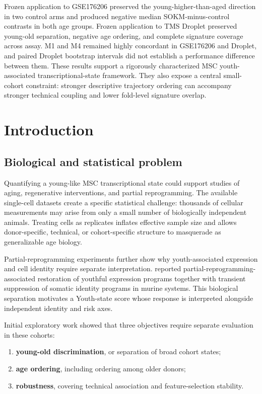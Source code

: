 \documentclass[10pt,twocolumn]{article}
\providecommand{\tightlist}{\setlength{\itemsep}{0pt}\setlength{\parskip}{0pt}}
\begin{document}
Frozen application to GSE176206 preserved the young-higher-than-aged direction in two control arms and produced negative median SOKM-minus-control contrasts in both age groups. Frozen application to TMS Droplet preserved young-old separation, negative age ordering, and complete signature coverage across assay. M1 and M4 remained highly concordant in GSE176206 and Droplet, and paired Droplet bootstrap intervals did not establish a performance difference between them. These results support a rigorously characterized MSC youth-associated transcriptional-state framework. They also expose a central small-cohort constraint: stronger descriptive trajectory ordering can accompany stronger technical coupling and lower fold-level signature overlap.

\section{Introduction}\label{introduction}

\subsection{Biological and statistical problem}\label{biological-and-statistical-problem}

Quantifying a young-like MSC transcriptional state could support studies of aging, regenerative interventions, and partial reprogramming. The available single-cell datasets create a specific statistical challenge: thousands of cellular measurements may arise from only a small number of biologically independent animals. Treating cells as replicates inflates effective sample size and allows donor-specific, technical, or cohort-specific structure to masquerade as generalizable age biology.

Partial-reprogramming experiments further show why youth-associated expression and cell identity require separate interpretation. \citet{roux2022} reported partial-reprogramming-associated restoration of youthful expression programs together with transient suppression of somatic identity programs in murine systems. This biological separation motivates a Youth-state score whose response is interpreted alongside independent identity and risk axes.

Initial exploratory work showed that three objectives require separate evaluation in these cohorts:

\begin{enumerate}
\def\labelenumi{\arabic{enumi}.}
\tightlist
\item
  \textbf{young-old discrimination}, or separation of broad cohort states;
\item
  \textbf{age ordering}, including ordering among older donors;
\item
  \textbf{robustness}, covering technical association and feature-selection stability.
\end{enumerate}
\end{document}
